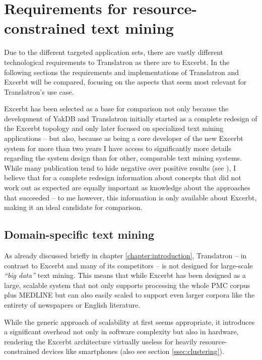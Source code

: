 \documentclass[a4paper, 12pt, twoside, reqn]{report}
\numberwithin{figure}{chapter}
\newtheorem[L]{boxedDefinition}{Definition}
\newtheorem[L]{boxedExample}{Example}
\newcommand{\itquote}[1]{\textit{{``}#1{''}}}
\begin{document}
\section{Requirements for resource-constrained text mining}

Due to the different targeted application sets, there are vastly different technological requirements to Translatron as there are to Excerbt. In the following sections the requirements and implementations of Translatron and Excerbt will be compared, focusing on the aspects that seem most relevant for Translatron's use case.

Excerbt has been selected as a base for comparison not only because the development of YakDB and Translatron initially started as a complete redesign of the Excerbt topology and only later focused on specialized text mining applications -- but also, because as being a core developer of the new Excerbt system for more than two years I have access to significantly more details regarding the system design than for other, comparable text mining systems. While many publication tend to hide negative over positive results (see \cite{fanelli2012negative}), I believe that for a complete redesign information about concepts that did not work out as expected are equally important as knowledge about the approaches that succeeded -- to me however, this information is only available about Excerbt, making it an ideal candidate for comparison.

\subsection{Domain-specific text mining}\label{ssec:domain-specific-textmining}

As already discussed briefly in chapter \ref{chapter:introduction}, Translatron -- in contrast to Excerbt and many of its competitors -- is not designed for large-scale \itquote{big data} text mining. This means that while Excerbt has been designed as a large, scalable system that not only supports processing the whole PMC corpus plus MEDLINE but can also easily scaled to support even larger corpora like the entirety of newspapers or English literature.

While the generic approach of scalability at first seems appropriate, it introduces a significant overhead not only in software complexity but also in hardware, rendering the Excerbt architecture virtually useless for heavily resource-constrained devices like smartphones (also see section \ref{ssec:clustering}).
\end{document}
